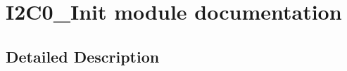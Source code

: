 \hypertarget{group___i2_c0___init__module}{}\section{I2\+C0\+\_\+\+Init module documentation}
\label{group___i2_c0___init__module}


\subsection{Detailed Description}
